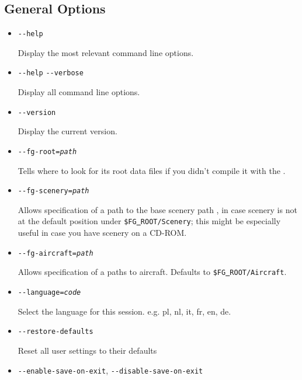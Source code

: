 {
  \subsection{General Options}\label{generaloptions}
  \begin{itemize}
  \item{\texttt{-$ $-help}}

    Display the most relevant command line options.

  \item{\texttt{-$ $-help} \texttt{-$ $-verbose}}

    Display all command line options.

  \item{\texttt{-$ $-version} }

  Display the current \FlightGear{} version.

  \item{\texttt{-$ $-fg-root={\it path}}}

    Tells \FlightGear{} where to look for its root data files if you
    didn't compile it with the .

  \item{\texttt{-$ $-fg-scenery={\it path}}}

    Allows specification of a path to the base scenery path
    , in case scenery is not at the default
    position under \texttt{\$FG\underline{~}ROOT/Scenery}; this might
    be especially useful in case you have scenery on a CD-ROM.

  \item{\texttt{-$ $-fg-aircraft={\it path}}}

    Allows specification of a paths to aircraft. Defaults to
    \texttt{\$FG\underline{~}ROOT/Aircraft}.

  \item{\texttt{-$ $-language={\it code}}}

    Select the language for this session. e.g. pl, nl, it, fr, en, de.

  \item{\texttt{-$ $-restore-defaults}}

    Reset all user settings to their defaults

  \item{\texttt{-$ $-enable-save-on-exit}, \texttt{-$ $-disable-save-on-exit}}


\end{itemize}}
